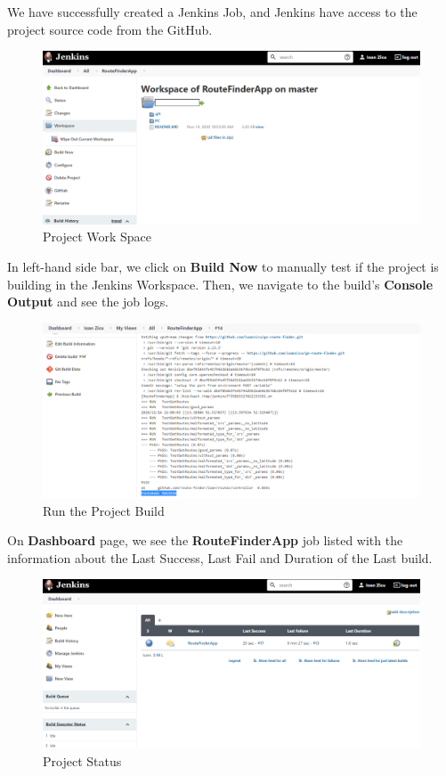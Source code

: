 \documentclass[12pt,a4paper,twoside]{article}
\begin{document}
We have successfully created a Jenkins Job, and Jenkins have access to the project source code from the GitHub.


\begin{figure}[H]
    \centering
        \includegraphics[width=15cm]{images-aws/37-project-workspace-git.png}
        \caption{Project Work Space}
\end{figure}


In left-hand side bar, we click on \textbf{Build Now} to manually test if the project is building in the Jenkins Workspace. Then, we navigate to the build's \textbf{Console Output} and see the job logs.


\begin{figure}[H]
    \centering
        \includegraphics[width=15cm]{images-aws/38-test-build.png}
        \caption{Run the Project Build}
\end{figure}


On \textbf{Dashboard} page, we see the \textbf{RouteFinderApp} job listed with the information about the Last Success, Last Fail and Duration of the Last build.


\begin{figure}[H]
    \centering
        \includegraphics[width=15cm]{images-aws/39-test-build-success.png}
        \caption{Project Status}
\end{figure}
\end{document}
